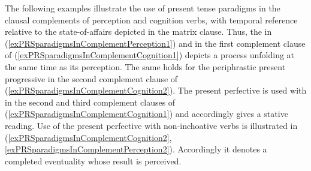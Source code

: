 The following examples illustrate the use of present tense paradigms in the clausal complements of perception and cognition verbs, with temporal reference relative to the state-of-affairs depicted in the matrix clause. Thus, the  in (\ref{exPRSparadigmsInComplementPerception1}) and in the first complement clause of (\ref{exPRSparadigmsInComplementCognition1}) depicts a process unfolding at the same time as its perception. The same holds for the periphrastic present progressive in the second complement clause of (\ref{exPRSparadigmsInComplementCognition2}). The present perfective is used with  in the second and third complement clauses of (\ref{exPRSparadigmsInComplementCognition1}) and accordingly gives a stative reading. Use of the present perfective with non-inchoative verbs is illustrated in (\ref{exPRSparadigmsInComplementCognition2}, \ref{exPRSparadigmsInComplementPerception2}). Accordingly it denotes a completed eventuality whose result is perceived.
